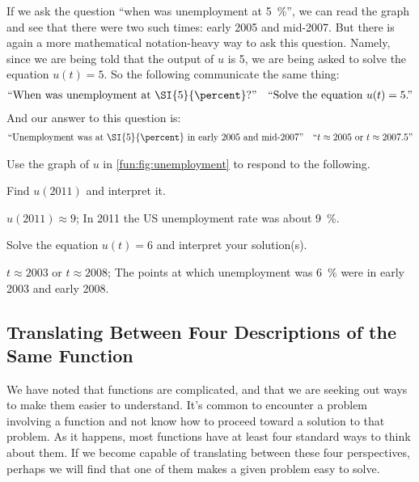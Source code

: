 \begin{pccexample}
	If we ask the question ``when was unemployment at \SI{5}{\percent}'', we can read the graph and see that there were two such times: early 2005 and mid-2007. But there is again a more mathematical notation-heavy way to ask this question. Namely, since we are being told that the output of $u$ is \num{5}, we are being asked to solve the equation $u(t)=5$. So the following communicate the same thing:
	\begin{align*}
		\text{``When was unemployment at \SI{5}{\percent}?''} &   & \text{``Solve the equation $u(t)=5$.''} 
	\end{align*}
And our answer to this question is:
	\begin{align*}
		\text{``Unemployment was at \SI{5}{\percent} in early 2005 and mid-2007''} &   & \text{``$t\approx2005$ or $t\approx2007.5$''} 
	\end{align*}
	
	\end{pccexample}
	
	\begin{doyouunderstand}
		Use the graph of $u$ in \cref{fun:fig:unemployment} to respond to the following.
		\begin{problem}
		Find $u(2011)$ and interpret it.
		\begin{shortsolution}
			$u(2011)\approx9$; In 2011 the US unemployment rate was about \SI{9}{\percent}.
		\end{shortsolution}
		\end{problem}
		\begin{problem}
		Solve the equation $u(t)=6$ and interpret your solution(s).
		\begin{shortsolution}
			$t\approx2003$ or $t\approx2008$; The points at which unemployment was \SI{6}{\percent} were in early 2003 and early 2008.
		\end{shortsolution}
		\end{problem}
	\end{doyouunderstand}
	
	
	
	\subsection{Translating Between Four Descriptions of the Same Function}
	
	We have noted that functions are complicated, and that we are seeking out ways to make them easier to understand. It's common to encounter a problem involving a function and not know how to proceed toward a solution to that problem. As it happens, most functions have at least four standard ways to think about them. If we become capable of translating between these four perspectives, perhaps we will find that one of them makes a given  problem easy to solve.
	
